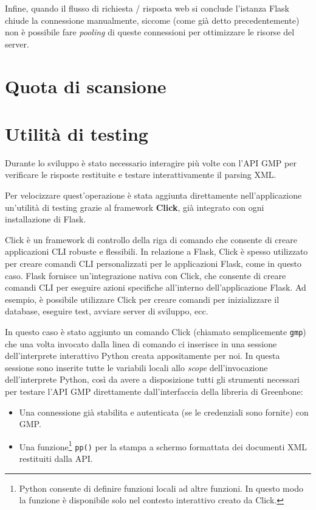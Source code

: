 Infine, quando il flusso di richiesta / risposta web si conclude l'istanza Flask chiude la connessione manualmente, siccome (come già detto precedentemente) non è possibile fare \emph{pooling} di queste connessioni per ottimizzare le risorse del server.

\section{Quota di scansione}

\section{Utilità di testing}
Durante lo sviluppo è stato necessario interagire più volte con l'API GMP per verificare le risposte restituite e testare interattivamente il parsing XML.

Per velocizzare quest'operazione è stata aggiunta direttamente nell'applicazione  un'utilità di testing grazie al framework \textbf{Click}, già integrato con ogni installazione di Flask.

Click è un framework di controllo della riga di comando che consente di creare applicazioni CLI robuste e flessibili. In relazione a Flask, Click è spesso utilizzato per creare comandi CLI personalizzati per le applicazioni Flask, come in questo caso.
Flask fornisce un'integrazione nativa con Click, che consente di creare comandi CLI per eseguire azioni specifiche all'interno dell'applicazione Flask. Ad esempio, è possibile utilizzare Click per creare comandi per inizializzare il database, eseguire test, avviare server di sviluppo, ecc.

In questo caso è stato aggiunto un comando Click (chiamato semplicemente \texttt{gmp}) che una volta invocato dalla linea di comando ci inserisce in una sessione dell'interprete interattivo Python creata appositamente per noi. In questa sessione sono inserite tutte le variabili locali allo \emph{scope} dell'invocazione dell'interprete Python, così da avere a disposizione tutti gli strumenti necessari per testare l'API GMP direttamente dall'interfaccia della libreria di Greenbone:
\begin{itemize}
    \item Una connessione già stabilita e autenticata (se le credenziali sono fornite) con GMP.
    \item Una funzione\footnote{Python consente di definire funzioni locali ad altre funzioni. In questo modo la funzione è disponibile solo nel contesto interattivo creato da Click.} \texttt{pp()} per la stampa a schermo formattata dei documenti XML restituiti dalla API.
\end{itemize}